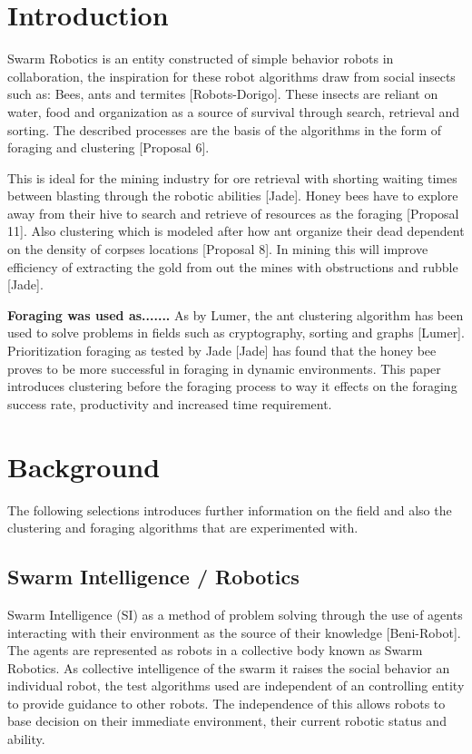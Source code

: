 \documentclass[12pt]{article}
\begin{document}
\section{Introduction}

\par{Swarm Robotics is an entity constructed of simple behavior  robots in collaboration, the inspiration for these robot algorithms draw from social insects such as: Bees, ants and termites [Robots-Dorigo]. These insects are reliant on water, food and organization as a source of survival through search, retrieval and sorting. The described processes are the basis of the algorithms in the form of foraging and clustering [Proposal 6].}

\par{This is ideal for the mining industry for ore retrieval with shorting waiting times between blasting through the robotic abilities [Jade]. Honey bees have to explore away from their hive to search and retrieve of resources as the foraging [Proposal 11]. Also clustering which is modeled after how ant organize their dead dependent on the density of corpses locations [Proposal 8]. In mining this will improve efficiency of extracting the gold from out the mines with obstructions and rubble [Jade].} 

\par{\textbf{Foraging was used as.......} As by Lumer, the ant clustering algorithm has been used to solve problems in fields such as cryptography, sorting and graphs [Lumer]. Prioritization foraging as tested by Jade [Jade] has found that the honey bee proves to be more successful in foraging in dynamic environments. This paper introduces clustering before the foraging process to way it effects on the foraging success rate, productivity and increased time requirement.}

\section{Background}

The following selections introduces further information on the field and also the clustering and foraging algorithms that are experimented with.

\subsection{Swarm Intelligence / Robotics}

\par{Swarm Intelligence (SI) as a method of problem solving through the use of agents interacting with their environment as the source of their knowledge [Beni-Robot]. The agents are represented as robots in a collective body known as Swarm Robotics. As collective intelligence of the swarm it raises the social behavior an individual robot, the test algorithms used are independent of an controlling entity to provide guidance to other robots. The independence of this allows robots to base decision on their immediate environment, their current robotic status and ability.}
\end{document}
